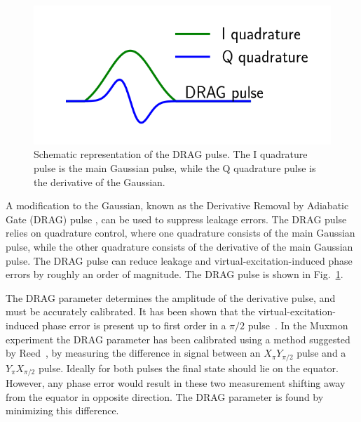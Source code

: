        \begin{figure}
          \begin{center}
          \vspace{-30pt}
            \includegraphics[width=\textwidth]{Figures/Exploring frequency re-use/DRAG pulse.png}
          \end{center}
          \vspace{-20 pt}
          \caption{Schematic representation of the DRAG pulse. The I quadrature pulse is the main Gaussian pulse, while the Q quadrature pulse is the derivative of the Gaussian.}
          \label{fig:DRAG pulse}
        \end{figure}

        A modification to the Gaussian, known as the Derivative Removal by Adiabatic Gate (DRAG) pulse \cite{motzoi2009simple}, can be used to suppress leakage errors. The DRAG pulse relies on quadrature control, where one quadrature consists of the main Gaussian pulse, while the other quadrature consists of the derivative of the main Gaussian pulse. The DRAG pulse can reduce leakage and virtual-excitation-induced phase errors by roughly an order of magnitude. The DRAG pulse is shown in Fig.~\ref{fig:DRAG pulse}.

        The DRAG parameter determines the amplitude of the derivative pulse, and must be accurately calibrated. It has been shown that the virtual-excitation-induced phase error is present up to first order in a $\pi/2$ pulse~\cite{lucero2010reduced}. In the Muxmon experiment the DRAG parameter has been calibrated using a method suggested by Reed~\cite{Reed}, by measuring the difference in signal between an $X_{\pi} Y_{\pi/2}$ pulse and a $Y_{\pi} X_{\pi/2}$ pulse. Ideally for both pulses the final state should lie on the equator. However, any phase error would result in these two measurement shifting away from the equator in opposite direction. The DRAG parameter is found by minimizing this difference.

